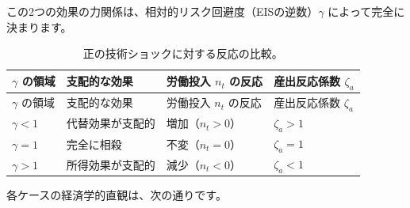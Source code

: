 \documentclass[
  japanese,
  lualatex,
  ja=standard,
  12pt,
  a4paper]{ltjsarticle}
\begin{document}
この2つの効果の力関係は、相対的リスク回避度（EISの逆数）\(\gamma\)
によって完全に決まります。

\begin{longtable}[]{@{}
  >{\raggedright\arraybackslash}p{}
  >{\raggedright\arraybackslash}p{}
  >{\raggedright\arraybackslash}p{}
  >{\raggedright\arraybackslash}p{}@{}}
\caption{正の技術ショックに対する反応の比較。}\label{tbl-technology-response-signs}\tabularnewline
\toprule\noalign{}
\begin{minipage}[b]{\linewidth}\raggedright
\(\gamma\) の領域
\end{minipage} & \begin{minipage}[b]{\linewidth}\raggedright
支配的な効果
\end{minipage} & \begin{minipage}[b]{\linewidth}\raggedright
労働投入 \(n_t\) の反応
\end{minipage} & \begin{minipage}[b]{\linewidth}\raggedright
産出反応係数 \(\zeta_a\)
\end{minipage} \\
\midrule\noalign{}
\endfirsthead
\toprule\noalign{}
\begin{minipage}[b]{\linewidth}\raggedright
\(\gamma\) の領域
\end{minipage} & \begin{minipage}[b]{\linewidth}\raggedright
支配的な効果
\end{minipage} & \begin{minipage}[b]{\linewidth}\raggedright
労働投入 \(n_t\) の反応
\end{minipage} & \begin{minipage}[b]{\linewidth}\raggedright
産出反応係数 \(\zeta_a\)
\end{minipage} \\
\midrule\noalign{}
\endhead
\bottomrule\noalign{}
\endlastfoot
\(\gamma < 1\) & 代替効果が支配的 & 増加（\(n_t > 0\)） &
\(\zeta_a > 1\) \\
\(\gamma = 1\) & 完全に相殺 & 不変（\(n_t = 0\)） & \(\zeta_a = 1\) \\
\(\gamma > 1\) & 所得効果が支配的 & 減少（\(n_t < 0\)） &
\(\zeta_a < 1\) \\
\end{longtable}

各ケースの経済学的直観は、次の通りです。
\end{document}
